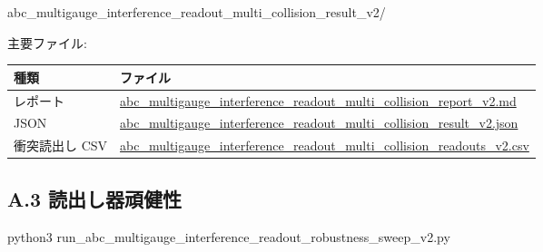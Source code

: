 \documentclass[
  a4paper,
]{article}
\newenvironment{Shaded}{}{}
\newcommand{\NormalTok}[1]{#1}
\newcounter{none} %
\begin{document}
\begin{Shaded}
\begin{Highlighting}[]
\NormalTok{abc\_multigauge\_interference\_readout\_multi\_collision\_result\_v2/}
\end{Highlighting}
\end{Shaded}

主要ファイル:

{\def\LTcaptype{none} %
\begin{longtable}[]{@{}
  >{\raggedright\arraybackslash}p{}
  >{\raggedright\arraybackslash}p{}@{}}
\toprule\noalign{}
\begin{minipage}[b]{\linewidth}\raggedright
種類
\end{minipage} & \begin{minipage}[b]{\linewidth}\raggedright
ファイル
\end{minipage} \\
\midrule\noalign{}
\endhead
\bottomrule\noalign{}
\endlastfoot
レポート &
\href{abc_multigauge_interference_readout_multi_collision_result_v2/abc_multigauge_interference_readout_multi_collision_report_v2.md}{abc\_multigauge\_interference\_readout\_multi\_collision\_report\_v2.md} \\
JSON &
\href{abc_multigauge_interference_readout_multi_collision_result_v2/abc_multigauge_interference_readout_multi_collision_result_v2.json}{abc\_multigauge\_interference\_readout\_multi\_collision\_result\_v2.json} \\
衝突読出し CSV &
\href{abc_multigauge_interference_readout_multi_collision_result_v2/abc_multigauge_interference_readout_multi_collision_readouts_v2.csv}{abc\_multigauge\_interference\_readout\_multi\_collision\_readouts\_v2.csv} \\
\end{longtable}
}

\subsection{A.3
読出し器頑健性}\label{a.3-ux8aadux51faux3057ux5668ux9811ux5065ux6027}

\begin{Shaded}
\begin{Highlighting}[]
\NormalTok{python3 run\_abc\_multigauge\_interference\_readout\_robustness\_sweep\_v2.py}
\end{Highlighting}
\end{Shaded}
\end{document}
